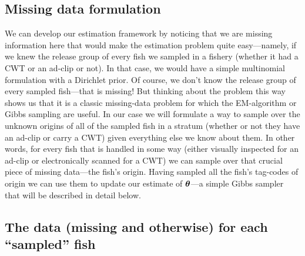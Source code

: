 \documentclass[11pt]{article}
\def\bm#1{\mathpalette\bmstyle{#1}}
\def\bmstyle#1#2{\mbox{\boldmath$#1#2$}}
\newcommand{\btheta}{\bm{\theta}}
\begin{document}
\subsection{Missing data formulation}
We can develop our estimation framework by noticing that we are missing information here
that would make the estimation problem quite easy---namely, if we knew the release group of every
fish we sampled in a fishery (whether it had a CWT or an ad-clip or not).  In that case, we would have a simple multinomial
formulation with a Dirichlet prior.  Of course, we don't know the release group of every sampled
fish---that is missing!  But thinking about the problem this way shows us that it is a classic
missing-data problem for which the EM-algorithm or Gibbs sampling are useful.  In our case we will
formulate a way to sample over the unknown origins of all of the sampled fish in a stratum (whether or 
not they have an ad-clip or carry a CWT) given 
everything else we know about them.
In other words, for every fish that is handled in some way (either visually inspected for an ad-clip or
electronically scanned for a CWT) we can sample over that crucial piece of missing data---the fish's origin.
Having sampled all the fish's tag-codes of origin we can use them to update our estimate of
$\btheta$---a simple Gibbs sampler that will be described in detail below.

\subsection{The data (missing and otherwise) for each ``sampled'' fish}
\end{document}
